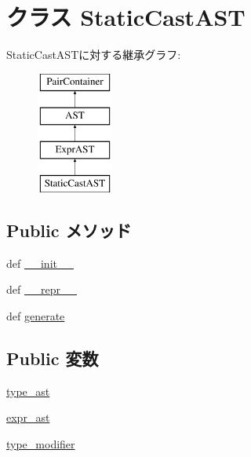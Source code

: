 \hypertarget{classslicc_1_1ast_1_1StaticCastAST_1_1StaticCastAST}{
\section{クラス StaticCastAST}
\label{classslicc_1_1ast_1_1StaticCastAST_1_1StaticCastAST}
}
StaticCastASTに対する継承グラフ:\begin{figure}[H]
\begin{center}
\leavevmode
\includegraphics[height=4cm]{classslicc_1_1ast_1_1StaticCastAST_1_1StaticCastAST}
\end{center}
\end{figure}
\subsection*{Public メソッド}
\begin{DoxyCompactItemize}
\item 
def \hyperlink{classslicc_1_1ast_1_1StaticCastAST_1_1StaticCastAST_ac775ee34451fdfa742b318538164070e}{\_\-\_\-init\_\-\_\-}
\item 
def \hyperlink{classslicc_1_1ast_1_1StaticCastAST_1_1StaticCastAST_ad8b9328939df072e4740cd9a63189744}{\_\-\_\-repr\_\-\_\-}
\item 
def \hyperlink{classslicc_1_1ast_1_1StaticCastAST_1_1StaticCastAST_a4555d1cee0dccf3942ea35fe86de2e8e}{generate}
\end{DoxyCompactItemize}
\subsection*{Public 変数}
\begin{DoxyCompactItemize}
\item 
\hyperlink{classslicc_1_1ast_1_1StaticCastAST_1_1StaticCastAST_a2c41e611550596541faa6f64ffecc139}{type\_\-ast}
\item 
\hyperlink{classslicc_1_1ast_1_1StaticCastAST_1_1StaticCastAST_a4faa2d9c34d29aa06b2dacd8c3aee45d}{expr\_\-ast}
\item 
\hyperlink{classslicc_1_1ast_1_1StaticCastAST_1_1StaticCastAST_a36af83e1bc7a4b0e2a167c181fcaa4ef}{type\_\-modifier}
\end{DoxyCompactItemize}


